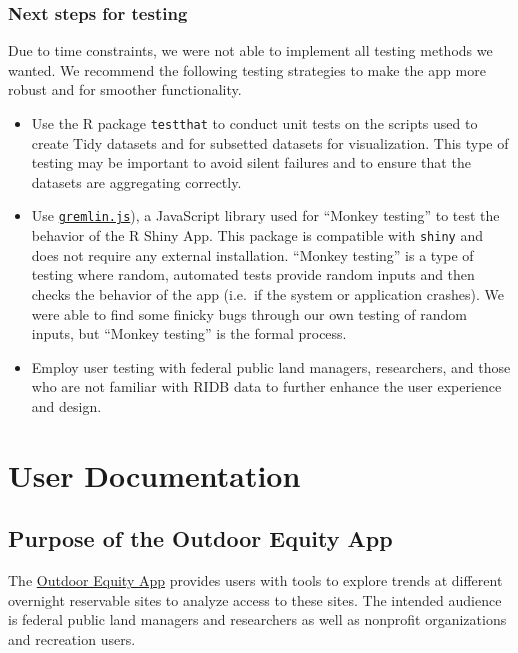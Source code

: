 \documentclass[
]{book}
\providecommand{\tightlist}{%
  \setlength{\itemsep}{0pt}\setlength{\parskip}{0pt}}
\begin{document}
\hypertarget{next-steps-for-testing}{%
\subsection{Next steps for testing}\label{next-steps-for-testing}}

Due to time constraints, we were not able to implement all testing methods we wanted. We recommend the following testing strategies to make the app more robust and for smoother functionality.

\begin{itemize}
\tightlist
\item
  Use the R package \texttt{testthat} \citep{R-testthat} to conduct unit tests on the scripts used to create Tidy datasets and for subsetted datasets for visualization. This type of testing may be important to avoid silent failures and to ensure that the datasets are aggregating correctly.
\item
  Use \href{https://github.com/marmelab/gremlins.js}{\texttt{gremlin.js}}), a JavaScript library used for ``Monkey testing'' to test the behavior of the R Shiny App. This package is compatible with \texttt{shiny} \citep{R-shiny} and does not require any external installation. ``Monkey testing'' is a type of testing where random, automated tests provide random inputs and then checks the behavior of the app (i.e.~if the system or application crashes). We were able to find some finicky bugs through our own testing of random inputs, but ``Monkey testing'' is the formal process.
\item
  Employ user testing with federal public land managers, researchers, and those who are not familiar with RIDB data to further enhance the user experience and design.
\end{itemize}

\hypertarget{user-documentation}{%
\chapter{User Documentation}\label{user-documentation}}

\hypertarget{purpose-of-the-outdoor-equity-app}{%
\section{Purpose of the Outdoor Equity App}\label{purpose-of-the-outdoor-equity-app}}

The \href{https://shinyapps.bren.ucsb.edu/oe_app/}{Outdoor Equity App} provides users with tools to explore trends at different overnight reservable sites to analyze access to these sites. The intended audience is federal public land managers and researchers as well as nonprofit organizations and recreation users.
\end{document}
